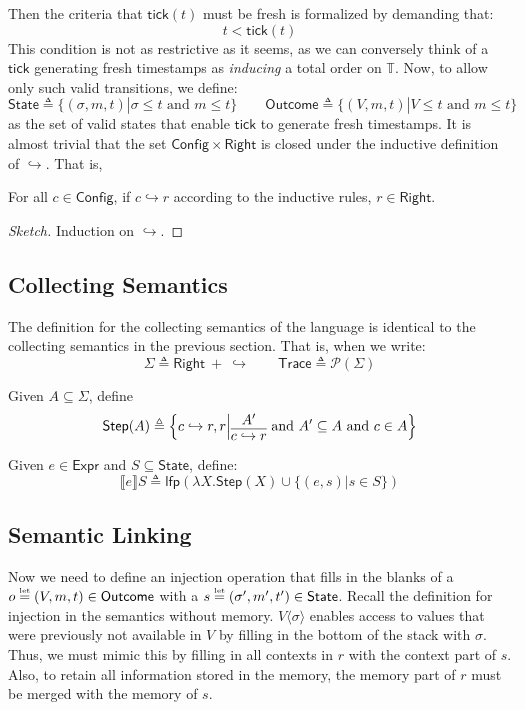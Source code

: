 \documentclass[acmsmall,screen,review]{acmart}\settopmatter{printfolios=true,printccs=false,printacmref=false}
\theoremstyle{acmdefinition}
\newcommand*{\pset}{\mathcal{P}}
\newcommand*{\Expr}{\mathsf{Expr}}
\newcommand*{\Time}{\mathbb{T}}
\newcommand*{\ctx}{\sigma}
\newcommand*{\mem}{m}
\newcommand*{\Trace}{\mathsf{Trace}}
\newcommand*{\Config}{\mathsf{Config}}
\newcommand*{\config}{c}
\newcommand*{\Right}{\mathsf{Right}}
\newcommand*{\rightst}{r}
\newcommand*{\texteq}[1]{\stackrel{\mathclap{\tiny\normalfont\mbox{#1}}}{=}}
\newcommand*{\State}{\mathsf{State}}
\newcommand*{\Outcome}{\mathsf{Outcome}}
\newcommand*{\lfp}{\mathsf{lfp}}
\newcommand*{\semarrow}{\hookrightarrow}
\newcommand*{\sembracket}[1]{\lBrack{#1}\rBrack}
\newcommand*{\tick}{\mathsf{tick}}
\newcommand*{\inject}[2]{{#2}\langle{#1}\rangle}
\begin{document}
Then the criteria that $\tick(t)$ must be fresh is formalized by demanding that:
\[t < \tick(t)\]
This condition is not as restrictive as it seems, as we can conversely think of a $\tick$ generating fresh timestamps as \emph{inducing} a total order on $\Time$.
Now, to allow only such valid transitions, we define:
\[
  \State\triangleq\{(\ctx,\mem,t)|\ctx\le t\text{ and }\mem\le t\}\qquad
  \Outcome\triangleq\{(V,\mem,t)|V\le t\text{ and }\mem\le t\}
\]
as the set of valid states that enable $\tick$ to generate fresh timestamps.
It is almost trivial that the set $\Config\times\Right$ is closed under the inductive definition of $\semarrow$.
That is,
\begin{lemma}
  For all $\config\in\Config$, if $\config\semarrow\rightst$ according to the inductive rules, $\rightst\in\Right$.
\end{lemma}
\begin{proof}[Sketch]
  Induction on $\semarrow$.
\end{proof}

\subsection{Collecting Semantics}
The definition for the collecting semantics of the language is identical to the collecting semantics in the previous section.
That is, when we write:
\[\Sigma\triangleq\Right\:+\:\semarrow\qquad\Trace\triangleq\pset(\Sigma)\]
\begin{definition}
  Given $A\subseteq \Sigma$, define
  \[
    \mathsf{Step}(A)\triangleq
    \left\{\config\semarrow\rightst, \rightst\middle|
    \begin{prooftree}[center=true]
      \hypo{A'}\infer1{\config\semarrow\rightst}
    \end{prooftree}\text{ and }
    A'\subseteq A\text{ and }\config\in A
    \right\}
  \]
\end{definition}
\begin{definition}
  Given $e\in\Expr$ and $S\subseteq\State$, define:
  \[
    \sembracket{e}S\triangleq\lfp(\lambda X.\mathsf{Step}(X)\cup\{(e,s)|s\in S\})
  \]
\end{definition}
\subsection{Semantic Linking}
Now we need to define an injection operation that fills in the blanks of a $o\texteq{let}(V,\mem,t)\in\Outcome$ with a $s\texteq{let}(\ctx',\mem',t')\in\State$.
Recall the definition for injection in the semantics without memory.
$\inject{\ctx}{V}$ enables access to values that were previously not available in $V$ by filling in the bottom of the stack with $\ctx$.
Thus, we must mimic this by filling in all contexts in $r$ with the context part of $s$.
Also, to retain all information stored in the memory, the memory part of $r$ must be merged with the memory of $s$.
\end{document}
